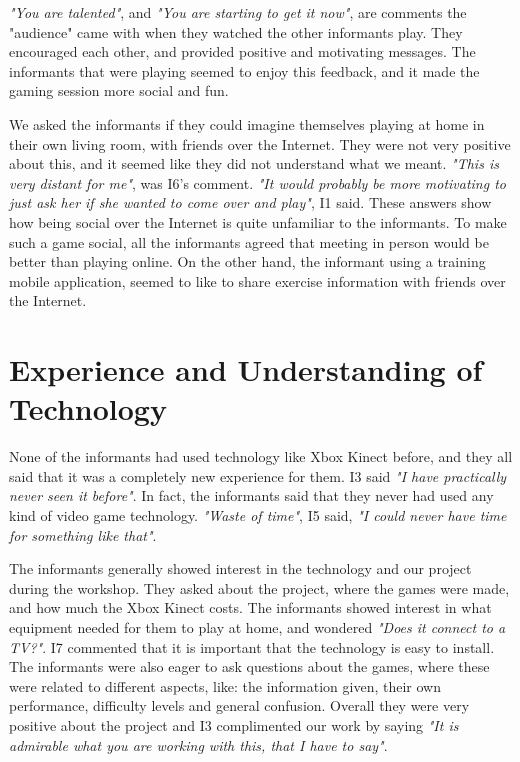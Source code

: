 \emph{"You are talented"}, and \emph{"You are starting to get it now"}, are comments the "audience" came with when they watched the other informants play. They encouraged each other, and provided positive and motivating messages. The informants that were playing seemed to enjoy this feedback, and it made the gaming session more social and fun.  

We asked the informants if they could imagine themselves playing at home in their own living room, with friends over the Internet. They were not very positive about this, and it seemed like they did not understand what we meant. \emph{"This is very distant for me"}, was I6's comment. \emph{"It would probably be more motivating to just ask her if she wanted to come over and play"}, I1 said. These answers show how being social over the Internet is quite unfamiliar to the informants. To make such a game social, all the informants agreed that meeting in person would be better than playing online. On the other hand, the informant using a training mobile application, seemed to like to share exercise information with friends over the Internet.

\section{Experience and Understanding of Technology}
None of the informants had used technology like Xbox Kinect before, and they all said that it was a completely new experience for them. I3 said \emph{"I have practically never seen it before"}. In fact, the informants said that they never had used any kind of video game technology. \emph{"Waste of time"}, I5 said, \emph{"I could never have time for something like that"}.  

The informants generally showed interest in the technology and our project during the workshop. They asked about the project, where the games were made, and how much the Xbox Kinect costs. The informants showed interest in what equipment needed for them to play at home, and wondered \emph{"Does it connect to a TV?"}. I7 commented that it is important that the technology is easy to install. The informants were also eager to ask questions about the games, where these were related to different aspects, like: the information given, their own performance, difficulty levels and general confusion. Overall they were very positive about the project and I3 complimented our work by saying \emph{"It is admirable what you are working with this, that I have to say"}. 

